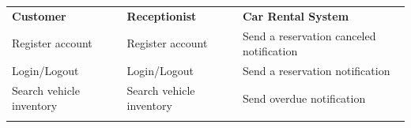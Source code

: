 \begin{center}
{\def\LTcaptype{none} %
\begin{longtable}[]{@{}
>{\raggedright\arraybackslash} p{}
>{\raggedright\arraybackslash} p{}
>{\raggedright\arraybackslash} p{}@{}}
\toprule\noalign{}
\endhead
\bottomrule\noalign{}
\endlastfoot
\begin{minipage}[t]{\linewidth}\raggedright
\textbf{Customer}
\end{minipage} & \begin{minipage}[t]{\linewidth}\raggedright
\textbf{Receptionist}
\end{minipage} & \begin{minipage}[t]{\linewidth}\raggedright
\textbf{Car Rental System}
\end{minipage} \\
\begin{minipage}[t]{\linewidth}\raggedright
Register account
\end{minipage} & \begin{minipage}[t]{\linewidth}\raggedright
Register account
\end{minipage} & \begin{minipage}[t]{\linewidth}\raggedright
Send a reservation canceled notification
\end{minipage} \\
\begin{minipage}[t]{\linewidth}\raggedright
Login/Logout
\end{minipage} & \begin{minipage}[t]{\linewidth}\raggedright
Login/Logout
\end{minipage} & \begin{minipage}[t]{\linewidth}\raggedright
Send a reservation notification
\end{minipage} \\
\begin{minipage}[t]{\linewidth}\raggedright
Search vehicle inventory
\end{minipage} & \begin{minipage}[t]{\linewidth}\raggedright
Search vehicle inventory
\end{minipage} & \begin{minipage}[t]{\linewidth}\raggedright
Send overdue notification
\end{minipage} \\
\begin{minipage}[t]{\linewidth}\raggedright

\end{minipage}
\end{longtable}}
\end{center}
